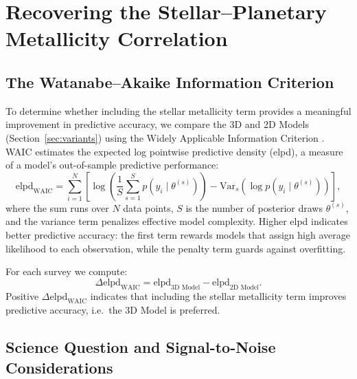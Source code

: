 \documentclass[twocolumn]{aastex631}
\begin{document}
\section{Recovering the Stellar--Planetary Metallicity
         Correlation}\label{sec:stellar_det}

\subsection{The Watanabe--Akaike Information
            Criterion}\label{sec:waic_def}

To determine whether including the stellar metallicity term provides
a meaningful improvement in predictive accuracy, we compare the 3D
and 2D Models (Section~\ref{sec:variants}) using the Widely
Applicable Information Criterion
\citep[WAIC;][]{watanabe2010,gelman2014understanding}. WAIC
estimates the expected log pointwise predictive density (elpd), a
measure of a model's out-of-sample predictive performance:
%
\begin{equation}\label{eq:elpd}
    \mathrm{elpd}_{\mathrm{WAIC}}
    = \sum_{i=1}^{N} \left[
        \log\!\left(\frac{1}{S}\sum_{s=1}^{S}
            p(y_i \mid \theta^{(s)})\right)
        - \mathrm{Var}_{s}\!\left(
            \log p(y_i \mid \theta^{(s)})\right)
    \right],
\end{equation}
%
where the sum runs over $N$ data points, $S$ is the number of
posterior draws $\theta^{(s)}$, and the variance term penalizes
effective model complexity. Higher elpd indicates better predictive
accuracy: the first term rewards models that assign high average
likelihood to each observation, while the penalty term guards against
overfitting.

For each survey we compute:
%
\begin{equation}\label{eq:dwaic_stellar}
    \Delta\mathrm{elpd}_{\mathrm{WAIC}}
        = \mathrm{elpd}_{\text{3D Model}}
         - \mathrm{elpd}_{\text{2D Model}}.
\end{equation}
%
Positive $\Delta\mathrm{elpd}_{\mathrm{WAIC}}$ indicates that
including the stellar metallicity term improves predictive accuracy,
i.e.\ the 3D Model is preferred.

\subsection{Science Question and Signal-to-Noise
            Considerations}\label{sec:science_q}
\end{document}
